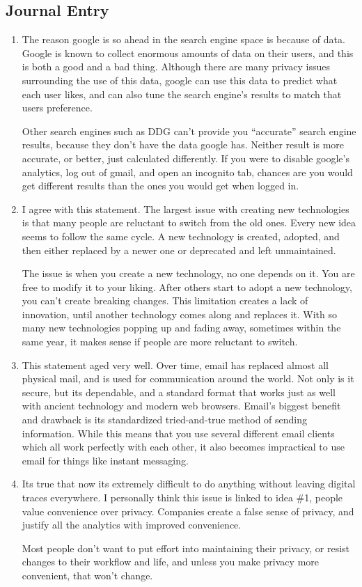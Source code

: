 \documentclass{scrartcl}
\begin{document}
\subsection{Journal Entry}
\label{sec:orge02eb67}
\begin{enumerate}
\item The reason google is so ahead in the search engine space is because of data.
Google is known to collect enormous amounts of data on their users, and this
is both a good and a bad thing. Although there are many privacy issues
surrounding the use of this data, google can use this data to predict what
each user likes, and can also tune the search engine's results to match that
users preference.

Other search engines such as DDG can't provide you ``accurate'' search engine
results, because they don't have the data google has. Neither result is more
accurate, or better, just calculated differently. If you were to disable
google's analytics, log out of gmail, and open an incognito tab, chances are
you would get different results than the ones you would get when logged in.

\item I agree with this statement. The largest issue with creating new technologies
is that many people are reluctant to switch from the old ones. Every new idea
seems to follow the same cycle. A new technology is created, adopted, and
then either replaced by a newer one or deprecated and left unmaintained.

The issue is when you create a new technology, no one depends on it. You are
free to modify it to your liking. After others start to adopt a new
technology, you can't create breaking changes. This limitation creates a lack
of innovation, until another technology comes along and replaces it. With so
many new technologies popping up and fading away, sometimes within the same
year, it makes sense if people are more reluctant to switch.

\item This statement aged very well. Over time, email has replaced almost all
physical mail,  and is used for communication around the world. Not only is
it secure, but its dependable, and a standard format that works just as well
with ancient technology and modern web browsers. Email's biggest benefit and
drawback is its standardized tried-and-true method of sending information.
While this means that you use several different email clients which all work
perfectly with each other, it also becomes impractical to use email for
things like instant messaging.

\item Its true that now its extremely difficult to do anything without leaving
digital traces everywhere. I personally think this issue is linked to idea
\#1, people value convenience over privacy. Companies create a false sense of
privacy, and justify all the analytics with improved convenience.

Most people don't want to put effort into maintaining their privacy, or
resist changes to their workflow and life, and unless you make privacy more
convenient, that won't change.
\end{enumerate}
\end{document}
